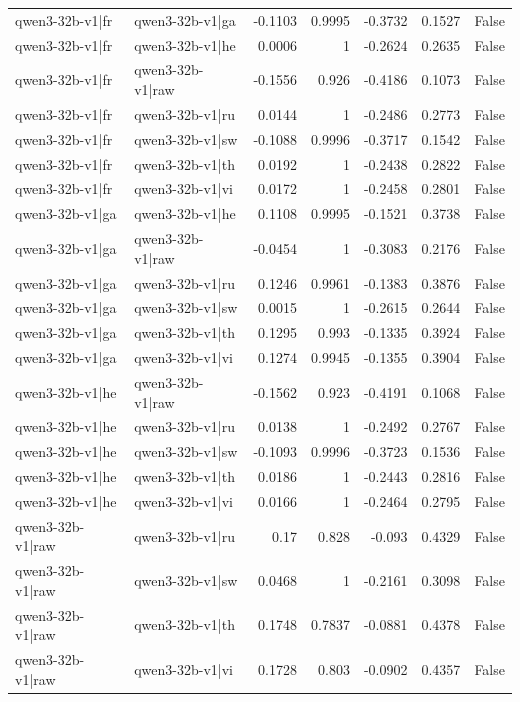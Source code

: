 \begin{table}
\begin{tabular}{l l r r r r l}
qwen3-32b-v1|fr & qwen3-32b-v1|ga & -0.1103 & 0.9995 & -0.3732 & 0.1527 & False \\
qwen3-32b-v1|fr & qwen3-32b-v1|he & 0.0006 & 1 & -0.2624 & 0.2635 & False \\
qwen3-32b-v1|fr & qwen3-32b-v1|raw & -0.1556 & 0.926 & -0.4186 & 0.1073 & False \\
qwen3-32b-v1|fr & qwen3-32b-v1|ru & 0.0144 & 1 & -0.2486 & 0.2773 & False \\
qwen3-32b-v1|fr & qwen3-32b-v1|sw & -0.1088 & 0.9996 & -0.3717 & 0.1542 & False \\
qwen3-32b-v1|fr & qwen3-32b-v1|th & 0.0192 & 1 & -0.2438 & 0.2822 & False \\
qwen3-32b-v1|fr & qwen3-32b-v1|vi & 0.0172 & 1 & -0.2458 & 0.2801 & False \\
qwen3-32b-v1|ga & qwen3-32b-v1|he & 0.1108 & 0.9995 & -0.1521 & 0.3738 & False \\
qwen3-32b-v1|ga & qwen3-32b-v1|raw & -0.0454 & 1 & -0.3083 & 0.2176 & False \\
qwen3-32b-v1|ga & qwen3-32b-v1|ru & 0.1246 & 0.9961 & -0.1383 & 0.3876 & False \\
qwen3-32b-v1|ga & qwen3-32b-v1|sw & 0.0015 & 1 & -0.2615 & 0.2644 & False \\
qwen3-32b-v1|ga & qwen3-32b-v1|th & 0.1295 & 0.993 & -0.1335 & 0.3924 & False \\
qwen3-32b-v1|ga & qwen3-32b-v1|vi & 0.1274 & 0.9945 & -0.1355 & 0.3904 & False \\
qwen3-32b-v1|he & qwen3-32b-v1|raw & -0.1562 & 0.923 & -0.4191 & 0.1068 & False \\
qwen3-32b-v1|he & qwen3-32b-v1|ru & 0.0138 & 1 & -0.2492 & 0.2767 & False \\
qwen3-32b-v1|he & qwen3-32b-v1|sw & -0.1093 & 0.9996 & -0.3723 & 0.1536 & False \\
qwen3-32b-v1|he & qwen3-32b-v1|th & 0.0186 & 1 & -0.2443 & 0.2816 & False \\
qwen3-32b-v1|he & qwen3-32b-v1|vi & 0.0166 & 1 & -0.2464 & 0.2795 & False \\
qwen3-32b-v1|raw & qwen3-32b-v1|ru & 0.17 & 0.828 & -0.093 & 0.4329 & False \\
qwen3-32b-v1|raw & qwen3-32b-v1|sw & 0.0468 & 1 & -0.2161 & 0.3098 & False \\
qwen3-32b-v1|raw & qwen3-32b-v1|th & 0.1748 & 0.7837 & -0.0881 & 0.4378 & False \\
qwen3-32b-v1|raw & qwen3-32b-v1|vi & 0.1728 & 0.803 & -0.0902 & 0.4357 & False \\

\end{tabular}
\end{table}
